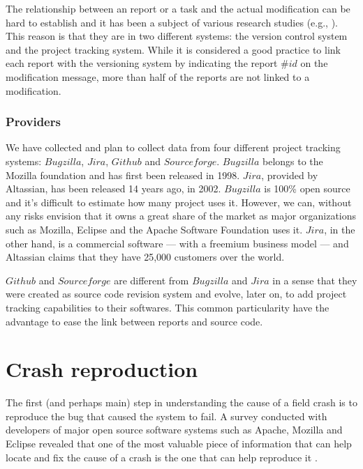 The relationship between an report or a task and the actual modification can be hard to establish and it has been a subject of various research studies (e.g., \cite{Antoniol2002,Bachmann2010,Wu2011}).
This reason is that they are in two different systems: the version control system and the project tracking system.
While it is considered a good practice to link each report with the versioning system by indicating the report $\#id$ on the modification message, more than half of the reports are not linked to a modification\cite{Wu2011}.

\subsubsection{Providers\label{sec:bug-provider}}

We have collected and plan to collect data from four different project tracking systems: $Bugzilla$, $Jira$, $Github$ and $Sourceforge$.
 $Bugzilla$ belongs to the Mozilla foundation and has first been released in 1998.
 $Jira$, provided by Altassian, has been released 14 years ago, in 2002.
 $Bugzilla$ is 100\% open source and it's difficult to estimate how many project uses it.
 However, we can, without any risks envision that it owns a great share of the market as major organizations such as Mozilla, Eclipse and the Apache Software Foundation uses it.
 $Jira$, in the other hand, is a commercial software --- with a freemium business model --- and Altassian claims that they have 25,000 customers over the world.

$Github$ and $Sourceforge$ are different from $Bugzilla$ and $Jira$ in a sense that they were created as source code revision system and evolve, later on, to add project tracking capabilities to their softwares.
This common particularity have the advantage to ease the link between reports and source code.

\section{Crash reproduction\label{sec:rel-reproduction}}

The first (and perhaps main) step in understanding the cause of a field crash is to reproduce the bug that caused the system to fail.
A survey conducted with developers of major open source software systems such as Apache, Mozilla and Eclipse revealed that one of the most valuable piece of information that can help locate and fix the cause of a crash is the one that can help reproduce it \cite{Bettenburg2008}.

